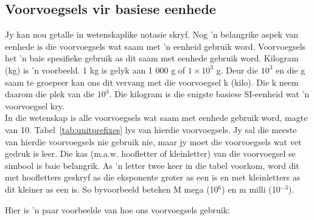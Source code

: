 \subsection*{Voorvoegsels vir basiese eenhede}
            \nopagebreak
Jy kan nou getalle in wetenskaplike notasie skryf. Nog  'n belangrike aspek van eenhede is die voorvoegsels wat saam met  'n eenheid gebruik word. Voorvoegsels het  'n baie spesifieke gebruik as dit saam met eenhede gebruik word. Kilogram (kg) is  'n voorbeeld. 1 kg is gelyk aan 1 000 g of $1\ensuremath{\times}{10}^{3}$ g. Deur die ${10}^{3}$ en die g saam te groepeer kan ons dit vervang met die voorvoegsel k (kilo). Die k neem daarom die plek van die ${10}^{3}$. Die kilogram is die enigste basiese SI-eenheid wat  'n voorvoegsel kry. \\
In die wetenskap is alle voorvoegsels wat saam met eenhede gebruik word, magte van 10. Tabel~\ref{tab:unitprefixes} lys van hierdie voorvoegsels. Jy sal die meeste van hierdie voorvoegsels nie gebruik nie, maar jy moet die voorvoegsels wat vet gedruk is leer. Die kas (m.a.w. hoofletter of kleinletter) van die voorvoegsel se simbool is baie belangrik. As  'n letter twee keer in die tabel voorkom, word dit met hoofletters geskryf as die eksponente groter as een is en met kleinletters as dit kleiner as een is. So byvoorbeeld beteken M mega (10${}^{6}$) en m milli (10${}^{-3}$).

Hier is  'n paar voorbeelde van hoe ons voorvoegsels gebruik:

